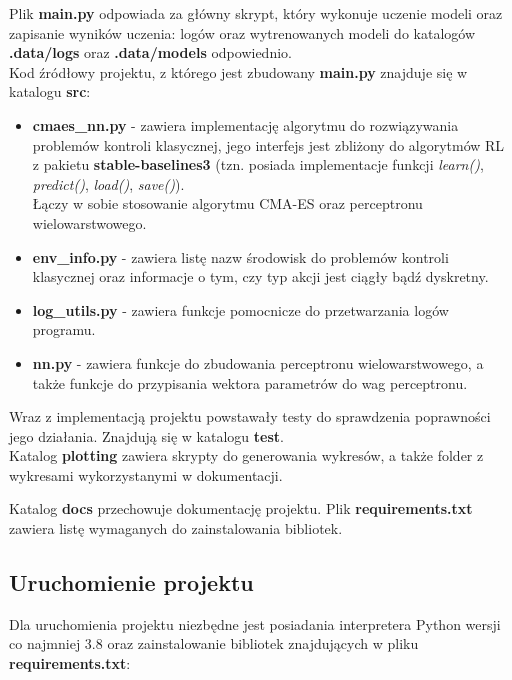 \documentclass[12pt,a4paper]{article}
\begin{document}
Plik \textbf{main.py} odpowiada za główny skrypt, który wykonuje uczenie
modeli oraz zapisanie wyników uczenia: logów oraz wytrenowanych modeli
do katalogów \textbf{.data/logs} oraz \textbf{.data/models} odpowiednio. \\

Kod źródłowy projektu, z którego jest zbudowany \textbf{main.py} znajduje się
w katalogu \textbf{src}:
\begin{itemize}
  \item \textbf{cmaes\_nn.py} - zawiera implementację algorytmu do rozwiązywania
        problemów kontroli klasycznej, jego interfejs jest zbliżony
        do algorytmów RL z pakietu \textbf{stable-baselines3}
        (tzn. posiada implementacje funkcji \emph{learn()}, \emph{predict()},
        \emph{load()}, \emph{save()}). \\
        Łączy w sobie stosowanie algorytmu CMA-ES oraz perceptronu wielowarstwowego.

  \item \textbf{env\_info.py} - zawiera listę nazw środowisk do problemów kontroli
        klasycznej oraz informacje o tym, czy typ akcji jest ciągły bądź dyskretny.

  \item \textbf{log\_utils.py} - zawiera funkcje pomocnicze do przetwarzania
        logów programu.

  \item \textbf{nn.py} - zawiera funkcje do zbudowania perceptronu
        wielowarstwowego, a także funkcje do przypisania wektora parametrów
        do wag perceptronu.
\end{itemize}

Wraz z implementacją projektu powstawały testy do sprawdzenia poprawności
jego działania. Znajdują się w katalogu \textbf{test}. \\

Katalog \textbf{plotting} zawiera skrypty do generowania wykresów,
a także folder z wykresami wykorzystanymi w dokumentacji.

Katalog \textbf{docs} przechowuje dokumentację projektu.
Plik \textbf{requirements.txt} zawiera listę wymaganych do zainstalowania
bibliotek.

\subsection{Uruchomienie projektu}

Dla uruchomienia projektu niezbędne jest posiadania interpretera Python wersji co najmniej 3.8
oraz zainstalowanie bibliotek znajdujących w pliku \textbf{requirements.txt}:
\end{document}
